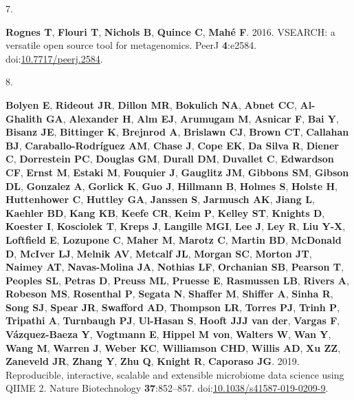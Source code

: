\documentclass[
]{article}
\newlength{\cslhangindent}
\newlength{\csllabelwidth}
\newlength{\cslentryspacingunit} %
\newenvironment{CSLReferences}[2] %
 {%
  \setlength{\parindent}{0pt}
  \ifodd #1
  \let\oldpar\par
  \def\par{\hangindent=\cslhangindent\oldpar}
  \fi
  \setlength{\parskip}{#2\cslentryspacingunit}
 }%
 {}
\newcommand{\CSLLeftMargin}[1]{\parbox[t]{\csllabelwidth}{#1}}
\newcommand{\CSLRightInline}[1]{\parbox[t]{\linewidth - \csllabelwidth}{#1}\break}
\begin{document}
\begin{CSLReferences}{0}{1}
\leavevmode{}%
\CSLLeftMargin{7. }%
\CSLRightInline{\textbf{Rognes T}, \textbf{Flouri T}, \textbf{Nichols
B}, \textbf{Quince C}, \textbf{Mahé F}. 2016. VSEARCH: a versatile open
source tool for metagenomics. PeerJ \textbf{4}:e2584.
doi:\href{https://doi.org/10.7717/peerj.2584}{10.7717/peerj.2584}.}

\leavevmode{}%
\CSLLeftMargin{8. }%
\CSLRightInline{\textbf{Bolyen E}, \textbf{Rideout JR}, \textbf{Dillon
MR}, \textbf{Bokulich NA}, \textbf{Abnet CC}, \textbf{Al-Ghalith GA},
\textbf{Alexander H}, \textbf{Alm EJ}, \textbf{Arumugam M},
\textbf{Asnicar F}, \textbf{Bai Y}, \textbf{Bisanz JE},
\textbf{Bittinger K}, \textbf{Brejnrod A}, \textbf{Brislawn CJ},
\textbf{Brown CT}, \textbf{Callahan BJ}, \textbf{Caraballo-Rodríguez
AM}, \textbf{Chase J}, \textbf{Cope EK}, \textbf{Da Silva R},
\textbf{Diener C}, \textbf{Dorrestein PC}, \textbf{Douglas GM},
\textbf{Durall DM}, \textbf{Duvallet C}, \textbf{Edwardson CF},
\textbf{Ernst M}, \textbf{Estaki M}, \textbf{Fouquier J},
\textbf{Gauglitz JM}, \textbf{Gibbons SM}, \textbf{Gibson DL},
\textbf{Gonzalez A}, \textbf{Gorlick K}, \textbf{Guo J},
\textbf{Hillmann B}, \textbf{Holmes S}, \textbf{Holste H},
\textbf{Huttenhower C}, \textbf{Huttley GA}, \textbf{Janssen S},
\textbf{Jarmusch AK}, \textbf{Jiang L}, \textbf{Kaehler BD},
\textbf{Kang KB}, \textbf{Keefe CR}, \textbf{Keim P}, \textbf{Kelley
ST}, \textbf{Knights D}, \textbf{Koester I}, \textbf{Kosciolek T},
\textbf{Kreps J}, \textbf{Langille MGI}, \textbf{Lee J}, \textbf{Ley R},
\textbf{Liu Y-X}, \textbf{Loftfield E}, \textbf{Lozupone C},
\textbf{Maher M}, \textbf{Marotz C}, \textbf{Martin BD},
\textbf{McDonald D}, \textbf{McIver LJ}, \textbf{Melnik AV},
\textbf{Metcalf JL}, \textbf{Morgan SC}, \textbf{Morton JT},
\textbf{Naimey AT}, \textbf{Navas-Molina JA}, \textbf{Nothias LF},
\textbf{Orchanian SB}, \textbf{Pearson T}, \textbf{Peoples SL},
\textbf{Petras D}, \textbf{Preuss ML}, \textbf{Pruesse E},
\textbf{Rasmussen LB}, \textbf{Rivers A}, \textbf{Robeson MS},
\textbf{Rosenthal P}, \textbf{Segata N}, \textbf{Shaffer M},
\textbf{Shiffer A}, \textbf{Sinha R}, \textbf{Song SJ}, \textbf{Spear
JR}, \textbf{Swafford AD}, \textbf{Thompson LR}, \textbf{Torres PJ},
\textbf{Trinh P}, \textbf{Tripathi A}, \textbf{Turnbaugh PJ},
\textbf{Ul-Hasan S}, \textbf{Hooft JJJ van der}, \textbf{Vargas F},
\textbf{Vázquez-Baeza Y}, \textbf{Vogtmann E}, \textbf{Hippel M von},
\textbf{Walters W}, \textbf{Wan Y}, \textbf{Wang M}, \textbf{Warren J},
\textbf{Weber KC}, \textbf{Williamson CHD}, \textbf{Willis AD},
\textbf{Xu ZZ}, \textbf{Zaneveld JR}, \textbf{Zhang Y}, \textbf{Zhu Q},
\textbf{Knight R}, \textbf{Caporaso JG}. 2019. Reproducible,
interactive, scalable and extensible microbiome data science using QIIME
2. Nature Biotechnology \textbf{37}:852--857.
doi:\href{https://doi.org/10.1038/s41587-019-0209-9}{10.1038/s41587-019-0209-9}.}


\end{CSLReferences}
\end{document}
